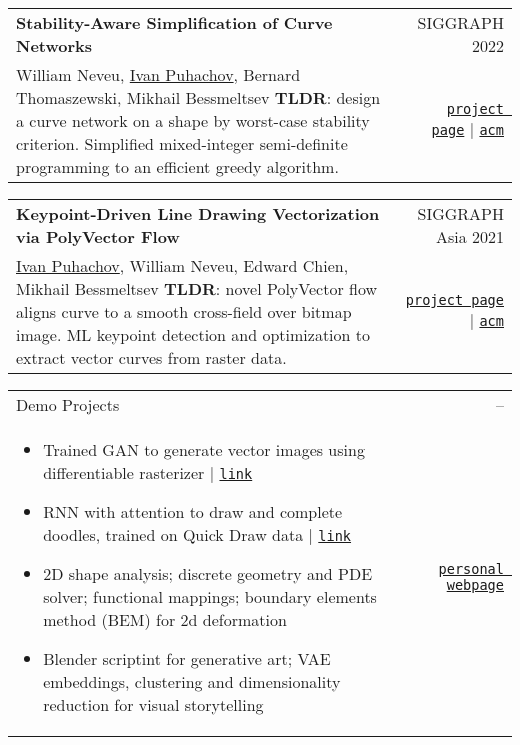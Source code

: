\documentclass[a4paper,20pt]{article}
\makeatletter
\newcommand{\experienceSmallheading}[4]{
	\vspace{-3pt}
	\item
	\begin{tabular*}{0.97\textwidth}[t]{@{}p{0.75\textwidth}@{\extracolsep{\fill}}r@{}}
		#1 & #2\\ 
		#3 & #4 \\
	\end{tabular*}\vspace{-5pt}
}
\makeatother
\begin{document}
	\vspace{3pt}
	
	\experienceSmallheading
	{\textbf{Stability-Aware Simplification of Curve Networks}}
	{SIGGRAPH 2022}
	{
		William Neveu, \underline{Ivan Puhachov}, Bernard Thomaszewski, Mikhail Bessmeltsev \newline
		\textbf{TLDR}: design a curve network on a shape by worst-case stability criterion. \newline
		Simplified mixed-integer semi-definite programming to an efficient greedy algorithm.
	}
	{
		\href{http://www-labs.iro.umontreal.ca/~bmpix/curve_networks/}{\texttt{project page}}
		|
		\href{https://dl.acm.org/doi/10.1145/3528233.3530711}{\texttt{acm}}
	}
	
	\vspace{3pt}
	\experienceSmallheading
	{\textbf{Keypoint-Driven Line Drawing Vectorization via PolyVector Flow}}
	{SIGGRAPH Asia 2021}
	{
		\underline{Ivan Puhachov}, William Neveu, Edward Chien, Mikhail Bessmeltsev \newline
		\textbf{TLDR}: novel PolyVector flow aligns curve to a smooth cross-field over bitmap image. \newline
		ML keypoint detection and optimization to extract vector curves from raster data.
	}
	{\href{https://puhachov.xyz/publications/keypoint-driven-polyvector-flow/}{\texttt{project page}}
	|
	\href{https://dl.acm.org/doi/10.1145/3478513.3480529}{\texttt{acm}}}
	
	\vspace{3pt}
	\experienceSmallheading
	{Demo Projects}
	{–}
	{
		\vspace{-2mm}
		\begin{itemize}[leftmargin=*, topsep=0pt, partopsep=0pt, itemsep=0pt, parsep=0pt]
            \item Trained GAN to generate vector images using differentiable rasterizer
			|
			\href{https://puhachov.xyz/projects/vector_gan/}{\texttt{link}}

			\item RNN with attention to draw and complete doodles, trained on Quick Draw data
			|
			\href{https://puhachov.xyz/projects/sketchrnn_attention/}{\texttt{link}}

			\item 2D shape analysis; discrete geometry and PDE solver; functional mappings; boundary elements method (BEM) for 2d deformation
			
			\item Blender scriptint for generative art; VAE embeddings, clustering and dimensionality reduction for visual storytelling
        \end{itemize}
		\vspace{-5mm}
	}
	{\href{https://puhachov.xyz/projects/}{\texttt{personal webpage}}}
\end{document}
